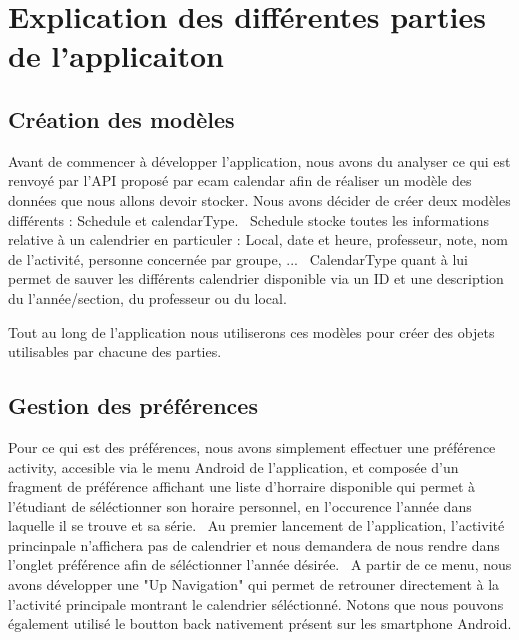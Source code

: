 \documentclass{article}
\begin{document}
	\section{Explication des différentes parties de l'applicaiton}
	\subsection{Création des modèles}
		Avant de commencer à développer l'application, nous avons du analyser ce qui est renvoyé par l'API proposé par ecam calendar
		afin de réaliser un modèle des données que nous allons devoir stocker. Nous avons décider de créer deux modèles différents :
		Schedule et calendarType. \
		Schedule stocke toutes les informations relative à un calendrier en particuler : Local, date et heure,
		professeur, note, nom de l'activité, personne concernée par groupe, ... \
		CalendarType quant à lui permet de sauver les différents calendrier disponible via un ID et une description du l'année/section,
		du professeur ou du local. \

		Tout au long de l'application nous utiliserons ces modèles pour créer des objets utilisables par chacune des parties.


	\subsection{Gestion des préférences}
		Pour ce qui est des préférences, nous avons simplement effectuer une préférence activity, accesible via le menu Android de l'application,
		et composée d'un fragment de préférence affichant une liste d'horraire disponible
		qui permet à l'étudiant de séléctionner son horaire personnel, en l'occurence l'année dans laquelle il se trouve et sa série. \
		Au premier lancement de l'application, l'activité princinpale n'affichera pas de calendrier et nous demandera de nous rendre dans
		l'onglet préférence afin de séléctionner l'année désirée. \
		A partir de ce menu, nous avons développer une "Up Navigation" qui permet de retrouner directement à la l'activité principale montrant
		le calendrier séléctionné. Notons que nous pouvons également utilisé le boutton back nativement présent sur les smartphone Android.
\end{document}

